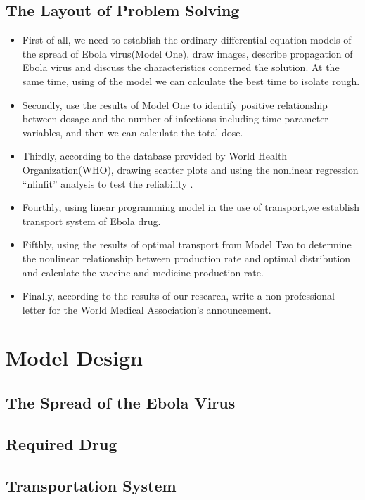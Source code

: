 \documentclass{icmmcm}
\begin{document}
\subsection{The Layout of Problem Solving}
\begin{itemize}
  \item First of all, we need to establish the ordinary
  differential equation models of the spread of Ebola
  virus(Model One), draw images, describe
  propagation of Ebola virus and discuss the characteristics
  concerned the solution. At the same time, using of the model
  we can calculate the best time to isolate rough.
  \item Secondly, use the results of Model One to identify
  positive relationship between dosage and the number of
  infections including time parameter variables, and then we
  can calculate the total dose.
  \item Thirdly, according to the database provided by World
  Health Organization(WHO), drawing scatter plots and using the
  nonlinear regression ``nlinfit'' analysis to test the
  reliability \cite{bib6}.
  \item Fourthly, using linear programming model in the use of
  transport,we establish transport system of Ebola drug.
  \item Fifthly, using the results of optimal transport from
  Model Two to determine the nonlinear relationship between
  production rate and optimal distribution and calculate the
  vaccine and medicine production rate.
  \item Finally, according to the results of our research,
  write a non-professional letter for the World Medical
  Association's announcement.
\end{itemize}

\section{Model Design}
\subsection{The Spread of the Ebola Virus}
\label{sec:m1}

\subsection{Required Drug}

\subsection{Transportation System}

\end{document}
